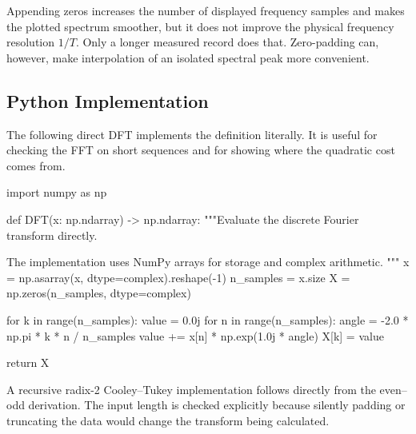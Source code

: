 Appending zeros increases the number of displayed frequency samples and makes
the plotted spectrum smoother, but it does not improve the physical frequency
resolution $ 1/T $. Only a longer measured record does that. Zero-padding can,
however, make interpolation of an isolated spectral peak more convenient.

\subsection{Python Implementation}

The following direct DFT implements the definition literally. It is useful for
checking the FFT on short sequences and for showing where the quadratic cost
comes from.

\begin{python}
import numpy as np


def DFT(x: np.ndarray) -> np.ndarray:
    """Evaluate the discrete Fourier transform directly.

    The implementation uses NumPy arrays for storage and complex arithmetic.
    """
    x = np.asarray(x, dtype=complex).reshape(-1)
    n_samples = x.size
    X = np.zeros(n_samples, dtype=complex)

    for k in range(n_samples):
        value = 0.0j
        for n in range(n_samples):
            angle = -2.0 * np.pi * k * n / n_samples
            value += x[n] * np.exp(1.0j * angle)
        X[k] = value

    return X
\end{python}

A recursive radix-2 Cooley--Tukey implementation follows directly from the
even--odd derivation. The input length is checked explicitly because silently
padding or truncating the data would change the transform being calculated.

